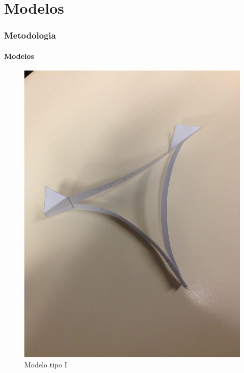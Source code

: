 \documentclass{beamer}
\begin{document}
\section{Modelos}
    \begin{frame}
        \frametitle{Metodologia}
            \framesubtitle{Modelos}
        \begin{figure}
            \label{fig:modelo tipo 1}
            \includegraphics[scale=0.1]{foto01}
            \caption{Modelo tipo I}
        \end{figure}
    \end{frame}
\end{document}
